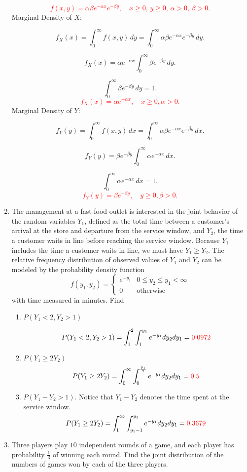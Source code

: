 \documentclass{article}
\begin{document}
\begin{enumerate}
\textcolor{red}{
\[
f(x, y) = \alpha \beta e^{-\alpha x} e^{-\beta y}, \quad x \geq 0, \, y \geq 0, \, \alpha > 0, \, \beta > 0.
\]
}
Marginal Density of \( X \):


\[
f_X(x) = \int_0^\infty f(x, y) \, dy = \int_0^\infty \alpha \beta e^{-\alpha x} e^{-\beta y} \, dy.
\]

\[
f_X(x) = \alpha e^{-\alpha x} \int_0^\infty \beta e^{-\beta y} \, dy.
\]

\[
\int_0^\infty \beta e^{-\beta y} \, dy = 1.
\]
\textcolor{red}{
\[
f_X(x) = \alpha e^{-\alpha x}, \quad x \geq 0, \alpha > 0.
\]
}
Marginal Density of \( Y \):

\[
f_Y(y) = \int_0^\infty f(x, y) \, dx = \int_0^\infty \alpha \beta e^{-\alpha x} e^{-\beta y} \, dx.
\]

\[
f_Y(y) = \beta e^{-\beta y} \int_0^\infty \alpha e^{-\alpha x} \, dx.
\]

\[
\int_0^\infty \alpha e^{-\alpha x} \, dx = 1.
\]
\textcolor{red}{
\[
f_Y(y) = \beta e^{-\beta y}, \quad y \geq 0, \beta > 0 .
\]
}
\pagebreak
\item The management at a fast-food outlet is interested in the joint behavior
of the random variables $Y_1$, defined as the total time between a customer’s arrival at
the store and departure from the service window, and $Y_2$, the time a customer waits
in line before reaching the service window. Because $Y_1$ includes the time a customer
waits in line, we must have $Y_1 \geq Y_2$. The relative frequency distribution of observed
values of $Y_1$ and $Y_2$ can be modeled by the probability density function
\[
f(y_1,y_2)=
\begin{cases}
    e^{-y_1} & 0 \leq y_2 \leq y_1 < \infty \\
    0 & \text{otherwise}
\end{cases}
\]
with time measured in minutes. Find
\begin{enumerate}
    \item $P(Y_1 < 2, Y_2 > 1)$

\[
P(Y_1 < 2, Y_2 > 1) = \int_1^2 \int_1^{y_1}e^{-y_1}dy_2dy_1 = \textcolor{red}{0.0972}
\]
    \item $P(Y_1 \geq 2Y_2)$
\[
P(Y_1 \geq 2Y_2) = \int_0^\infty \int_0^{\frac{y_1}{2}}e^{-y_1}dy_2dy_1 = \textcolor{red}{0.5}
\]
    \item $P(Y_1-Y_2 > 1)$. Notice that $Y_1-Y_2$ denotes the time spent at the service window.
\[
P(Y_1 \geq 2Y_2) = \int_1^\infty \int_{y_1-1}^{y_1}e^{-y_1}dy_2dy_1 = \textcolor{red}{0.3679}
\]
\end{enumerate}
\item Three players play $10$ independent rounds of a game, and each player has probability $\frac{1}{3}$ of winning each round. Find the joint distribution of the numbers of games won by each of the three players.


\end{enumerate}
\end{document}
